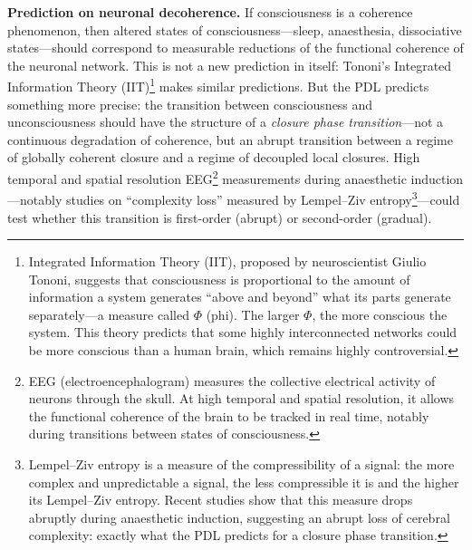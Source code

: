 \documentclass[12pt, a4paper, openright]{book}
\begin{document}
\textbf{Prediction on neuronal decoherence.} If consciousness is a coherence phenomenon, then altered states of consciousness---sleep, anaesthesia, dissociative states---should correspond to measurable reductions of the functional coherence of the neuronal network. This is not a new prediction in itself: Tononi's Integrated Information Theory (IIT)\footnote{Integrated Information Theory (IIT), proposed by neuroscientist Giulio Tononi, suggests that consciousness is proportional to the amount of information a system generates ``above and beyond'' what its parts generate separately---a measure called $\Phi$ (phi). The larger $\Phi$, the more conscious the system. This theory predicts that some highly interconnected networks could be more conscious than a human brain, which remains highly controversial.} makes similar predictions. But the PDL predicts something more precise: the transition between consciousness and unconsciousness should have the structure of a \emph{closure phase transition}---not a continuous degradation of coherence, but an abrupt transition between a regime of globally coherent closure and a regime of decoupled local closures. High temporal and spatial resolution EEG\footnote{EEG (electroencephalogram) measures the collective electrical activity of neurons through the skull. At high temporal and spatial resolution, it allows the functional coherence of the brain to be tracked in real time, notably during transitions between states of consciousness.} measurements during anaesthetic induction---notably studies on ``complexity loss'' measured by Lempel--Ziv entropy\footnote{Lempel--Ziv entropy is a measure of the compressibility of a signal: the more complex and unpredictable a signal, the less compressible it is and the higher its Lempel--Ziv entropy. Recent studies show that this measure drops abruptly during anaesthetic induction, suggesting an abrupt loss of cerebral complexity: exactly what the PDL predicts for a closure phase transition.}---could test whether this transition is first-order (abrupt) or second-order (gradual).

\medskip
\end{document}

